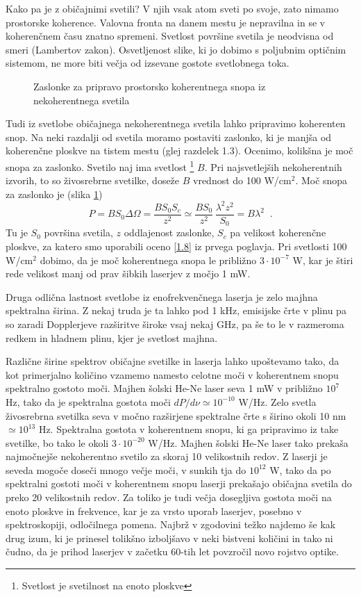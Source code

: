 Kako pa je z običajnimi svetili? V njih vsak atom sveti po svoje, zato
nimamo prostorske koherence. Valovna fronta na danem mestu je nepravilna in
se v koherenčnem času znatno spremeni. Svetlost površine svetila je
neodvisna od smeri (Lambertov zakon). Osvetljenost slike, ki jo dobimo s
poljubnim optičnim sistemom, ne more biti večja od izsevane gostote
svetlobnega toka.

\begin{figure}[tbp]
\label{s5.5} \vskip 5cm
\caption{Zaslonke za pripravo prostorsko koherentnega snopa iz
nekoherentnega svetila}
\end{figure}

Tudi iz svetlobe običajnega nekoherentnega svetila lahko pripravimo
koherenten snop. Na neki razdalji od svetila moramo postaviti zaslonko, ki
je manjša od koherenčne ploskve na tistem mestu (glej razdelek 1.3).
Ocenimo, kolikšna je moč snopa za zaslonko. Svetilo naj ima svetlost%
\footnote{%
Svetlost je svetilnost na enoto ploskve} $B$. Pri najsvetlejših
nekoherentnih izvorih, to so živosrebrne svetilke, doseže $B$ vrednost
do 100 W/cm$^{2}$. Moč snopa za zaslonko je (slika \ref{s5.5}) 
\begin{equation}
P=BS_{0}\Delta \Omega =\frac{BS_{0}S_{c}}{z^{2}}\simeq \frac{BS_{0}}{z^{2}}\,%
\frac{\lambda ^{2}z^{2}}{S_{0}}=B\lambda ^{2}\;\;.  \label{5.21}
\end{equation}
Tu je $S_{0}$ površina svetila, $z$ oddlajenost zaslonke, $S_{c}$ pa
velikost koherenčne ploskve, za katero smo uporabili oceno \ref{1.8} iz
prvega poglavja. Pri svetlosti 100 W/cm$^{2}$ dobimo, da je moč
koherentnega snopa le približno $3\cdot 10^{-7}$ W, kar je štiri rede
velikost manj od prav šibkih laserjev z močjo 1 mW.

Druga odlična lastnost svetlobe iz enofrekvenčnega laserja je zelo majhna
spektralna širina. Z nekaj truda je ta lahko pod 1 kHz, emisijske črte v
plinu pa so zaradi Dopplerjeve razširitve široke vsaj nekaj GHz, pa še to
le v razmeroma redkem in hladnem plinu, kjer je svetlost majhna.

Različne širine spektrov običajne svetilke in laserja lahko
upoštevamo tako, da kot primerjalno količino vzamemo namesto celotne
moči v koherentnem snopu spektralno gostoto moči. Majhen šolski He-Ne
laser seva 1 mW v približno $10^{7}$ Hz, tako da je spektralna gostota
moči $dP/d\nu \simeq 10^{-10}$ W/Hz. Zelo svetla živosrebrna svetilka
seva v močno razširjene spektralne črte s širino okoli 10 nm $\simeq
10^{13}$ Hz. Spektralna gostota v koherentnem snopu, ki ga pripravimo iz
take svetilke, bo tako le okoli $3\cdot 10^{-20}$ W/Hz. Majhen šolski
He-Ne laser tako prekaša najmočnejše nekoherentno svetilo za skoraj 10
velikostnih redov. Z laserji je seveda mogoče doseči mnogo večje
moči, v sunkih tja do $10^{12}$ W, tako da po spektralni gostoti moči v
koherentnem snopu laserji prekašajo običajna svetila do preko 20
velikostnih redov. Za toliko je tudi večja dosegljiva gostota moči na
enoto ploskve in frekvence, kar je za vrsto uporab laserjev, posebno v
spektroskopiji, odločilnega pomena. Najbrž v zgodovini težko najdemo
še kak drug izum, ki je prinesel tolikšno izboljšavo v neki bistveni
količini in tako ni čudno, da je prihod laserjev v začetku 60-tih let
povzročil novo rojstvo optike.

